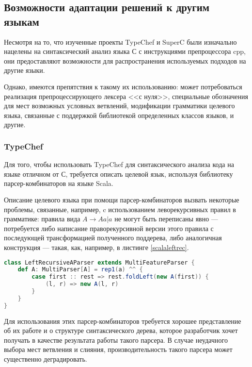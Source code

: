 \subsection{Возможности адаптации решений к другим языкам}
\label{subsec:solutionsadaptation}

Несмотря на то, что изученные проекты TypeChef и SuperC были изначально нацелены на синтаксический анализ языка С с инструкциями препроцессора cpp, они предоставляют возможности для распространения используемых подходов на другие языки. 

Однако, имеются препятствия к такому их использованию: может потребоваться реализация препроцессирующего лексера <<с нуля>>, специальные обозначения для мест возможных условных ветвлений, модификации грамматики целевого языка, связанные с поддержкой библиотекой определенных классов языков, и другие.

\subsubsection{TypeChef}

Для того, чтобы использовать TypeChef для синтаксического анализа кода на языке отличном от С, требуется описать целевой язык, используя библиотеку парсер-комбинаторов на языке Scala.

Описание целевого языка при помощи парсер-комбинаторов вызвать некоторые проблемы, связанные, например, c использованием леворекурсивных правил в грамматике: правила вида $A \to A a | a$ не могут быть переписаны явно --- потребуется либо написание праворекурсивной версии этого правила с последующей трансформацией полученного поддерева, либо аналогичная конструкция --- такая, как, например, в листинге \ref{scalaleftrec}.

\begin{minipage}{\linewidth}
\begin{lstlisting}[caption={Описание леворекурсивных правил с парсер-комбинаторами TypeChef},label=scalaleftrec,language=Scala]
class LeftRecursiveAParser extends MultiFeatureParser {
	def A: MultiParser[A] = rep1(a) ^^ {
		case first :: rest => rest.foldLeft(new A(first)) {
			(l, r) => new A(l, r)
		}
	}
}
\end{lstlisting}
\end{minipage}

Для использования этих парсер-комбинаторов требуется хорошее представление об их работе и о структуре синтаксического дерева, которое разработчик хочет получать в качестве результата работы такого парсера. В случае неудачного выбора мест ветвления и слияния, производительность такого парсера может существенно деградировать.

